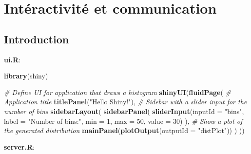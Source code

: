 \documentclass[
]{article}
\newenvironment{Shaded}{\begin{snugshade}}{\end{snugshade}}
\newcommand{\AttributeTok}[1]{\textcolor[rgb]{0.13,0.29,0.53}{#1}}
\newcommand{\CommentTok}[1]{\textcolor[rgb]{0.56,0.35,0.01}{\textit{#1}}}
\newcommand{\DecValTok}[1]{\textcolor[rgb]{0.00,0.00,0.81}{#1}}
\newcommand{\FunctionTok}[1]{\textcolor[rgb]{0.13,0.29,0.53}{\textbf{#1}}}
\newcommand{\NormalTok}[1]{#1}
\newcommand{\StringTok}[1]{\textcolor[rgb]{0.31,0.60,0.02}{#1}}
\begin{document}
\hypertarget{intuxe9ractivituxe9-et-communication}{%
\section{Intéractivité et
communication}\label{intuxe9ractivituxe9-et-communication}}

\hypertarget{introduction}{%
\subsection{Introduction}\label{introduction}}

\textbf{ui.R}:

\begin{Shaded}
\begin{Highlighting}[]
\FunctionTok{library}\NormalTok{(shiny)}

\CommentTok{\# Define UI for application that draws a histogram}
\FunctionTok{shinyUI}\NormalTok{(}\FunctionTok{fluidPage}\NormalTok{(}
  \CommentTok{\# Application title}
  \FunctionTok{titlePanel}\NormalTok{(}\StringTok{"Hello Shiny!"}\NormalTok{),}
  \CommentTok{\# Sidebar with a slider input for the number of bins}
  \FunctionTok{sidebarLayout}\NormalTok{(}
    \FunctionTok{sidebarPanel}\NormalTok{(}
      \FunctionTok{sliderInput}\NormalTok{(}\AttributeTok{inputId =} \StringTok{"bins"}\NormalTok{, }
                  \AttributeTok{label =} \StringTok{"Number of bins:"}\NormalTok{,}
                  \AttributeTok{min =} \DecValTok{1}\NormalTok{, }\AttributeTok{max =} \DecValTok{50}\NormalTok{, }\AttributeTok{value =} \DecValTok{30}\NormalTok{)}
\NormalTok{    ),}
    \CommentTok{\# Show a plot of the generated distribution}
    \FunctionTok{mainPanel}\NormalTok{(}\FunctionTok{plotOutput}\NormalTok{(}\AttributeTok{outputId =} \StringTok{"distPlot"}\NormalTok{))}
\NormalTok{  )}
\NormalTok{))}
\end{Highlighting}
\end{Shaded}

\textbf{server.R}:
\end{document}
